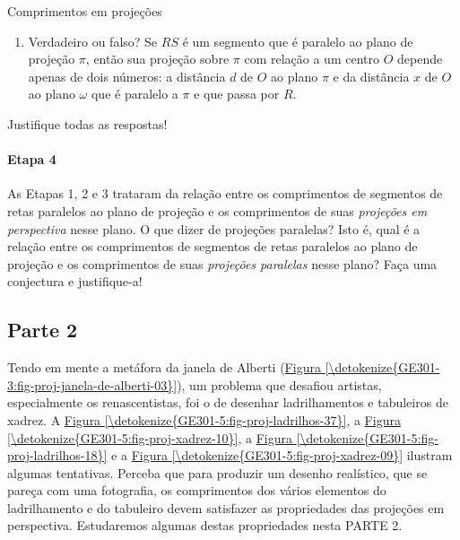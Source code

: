 \begin{task}{Comprimentos em projeções}
\begin{enumerate}
\item {} 
Verdadeiro ou falso? Se \(RS\) é um segmento que é paralelo ao plano de projeção \(\pi\), então sua projeção sobre \(\pi\) com relação a um centro \(O\) depende apenas de dois números: a distância \(d\) de \(O\) ao plano \(\pi\) e da distância \(x\) de \(O\) ao plano \(\omega\) que é paralelo a \(\pi\) e que passa por \(R\).

\end{enumerate}

Justifique todas as respostas!

\paragraph{Etapa 4}

As Etapas 1, 2 e 3 trataram da relação entre os comprimentos de segmentos de retas paralelos ao plano de projeção e os comprimentos de suas \emph{projeções em perspectiva} nesse plano. O que dizer de projeções paralelas? Isto é, qual é a relação entre os comprimentos de segmentos de retas paralelos ao plano de projeção e os comprimentos de suas \emph{projeções paralelas} nesse plano? Faça uma conjectura e justifique-a!

\subsection{Parte 2}


Tendo em mente a metáfora da janela de Alberti (\hyperref[\detokenize{GE301-3:fig-proj-janela-de-alberti-03}]{Figura \ref{\detokenize{GE301-3:fig-proj-janela-de-alberti-03}}}), um problema que desafiou artistas, especialmente os renascentistas, foi o de desenhar ladrilhamentos e tabuleiros de xadrez. A \hyperref[\detokenize{GE301-5:fig-proj-ladrilhos-37}]{Figura \ref{\detokenize{GE301-5:fig-proj-ladrilhos-37}}}, a \hyperref[\detokenize{GE301-5:fig-proj-xadrez-10}]{Figura \ref{\detokenize{GE301-5:fig-proj-xadrez-10}}}, a \hyperref[\detokenize{GE301-5:fig-proj-ladrilhos-18}]{Figura \ref{\detokenize{GE301-5:fig-proj-ladrilhos-18}}} e a \hyperref[\detokenize{GE301-5:fig-proj-xadrez-09}]{Figura \ref{\detokenize{GE301-5:fig-proj-xadrez-09}}} ilustram algumas tentativas. Perceba que para produzir um desenho realístico, que se pareça com uma fotografia, os comprimentos dos vários elementos do ladrilhamento e do tabuleiro devem satisfazer as propriedades das projeções em perspectiva. Estudaremos algumas destas propriedades nesta PARTE 2.

\begin{multicols}{2}
\begin{figure}[H]
\centering
\capstart


\end{figure}
\end{multicols}
\end{task}
